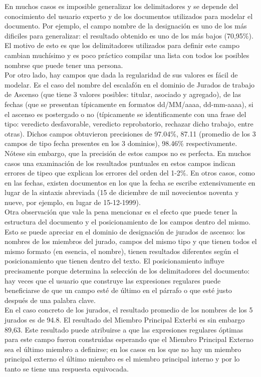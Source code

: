 En muchos casos es imposible generalizar los delimitadores y se depende del conocimiento del usuario experto y de los documentos utilizados para modelar el documento. Por ejemplo, el campo nombre de la designación es uno de los más dificiles para generalizar: el resultado obtenido es uno de los más bajos (70,95\%). El motivo de esto es que los delimitadores utilizados para definir este campo cambian muchísimo y es poco práctico compilar una lista con todos los posibles nombrse que puede tener una persona. \\

Por otro lado, hay campos que dada la regularidad de sus valores es fácil de modelar. Es el caso del nombre del escalafón en el dominio de Jurados de trabajo de Ascenso (que tiene 3 valores posibles: titular, asociado y agregado), de las fechas (que se presentan típicamente en formatos dd/MM/aaaa, dd-mm-aaaa), si el ascenso es postergado o no (típicamente se identificamente con una frase del tipo: veredicto desfavorable, veredicto reprobatorio, rechazar dicho trabajo, entre otras). Dichos campos obtuvieron precisiones de 97.04\%, 87.11 (promedio de los 3 campos de tipo fecha presentes en los 3 dominios), 98.46\% respectivamente. Nótese sin embargo, que la precisión de estos campos no es perfecta. En muchos casos una examinación de los resultados puntuales en estos campos indican errores de tipeo que explican los errores del orden del 1-2\%. En otros casos, como en las fechas, existen documentos en los que la fecha se escribe extensivamente en lugar de la sintaxis abreviada (15 de diciembre de mil novecientos noventa y nueve, por ejemplo, en lugar de 15-12-1999). \\

Otra observación que vale la pena mencionar es el efecto que puede tener la estructura del documento y el posicionamiento de los campos dentro del mismo. Esto se puede apreciar en el dominio de designación de jurados de ascenso: los nombres de los miembros del jurado, campos del mismo tipo y que tienen todos el mismo formato (en esencia, el nombre), tienen resultados diferentes según el posicionamiento que tienen dentro del texto. El posicionamiento influye precisamente porque determina la selección de los delimitadores del documento: hay veces que el usuario que construye las expresiones regulares puede beneficiarse de que un campo esté de último en el párrafo o que esté justo después de una palabra clave. \\

En el caso concreto de los jurados, el resultado promedio de los nombres de los 5 jurados es de 94.8. El resultado del Miembro Principal Exterbi es sin embargo 89,63. Este resultado puede atribuirse a que las expresiones regulares óptimas para este campo fueron construidas esperando que el Miembro Principal Externo sea el último miembro a definirse; en los casos en los que no hay un miembro principal externo el último miembro es el miembro principal interno y por lo tanto se tiene una respuesta equivocada. \\

